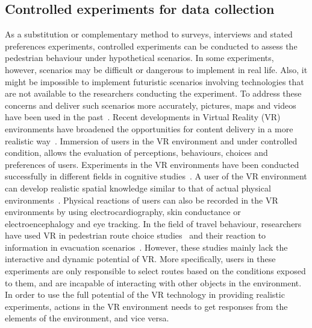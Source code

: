  \subsection{Controlled experiments for data collection}
 As a substitution or complementary method to surveys, interviews and stated preferences experiments, controlled experiments can be conducted to assess the pedestrian behaviour under hypothetical scenarios. In some experiments, however, scenarios may be difficult or dangerous to implement in real life. Also, it might be impossible to implement futuristic scenarios involving technologies that are not available to the researchers conducting the experiment. To address these concerns and deliver such scenarios more accurately, pictures, maps and videos have been used in the past~\cite{song2018external}. Recent developments in Virtual Reality (VR) environments have broadened the opportunities for content delivery in a more realistic way~\cite{farooq2018virtual,jennett2008measuring,animesh2011odyssey,nah2011enhancing,faiola2013correlating}. Immersion of users in the VR environment and under controlled condition, allows the evaluation of perceptions, behaviours, choices and preferences of users. Experiments in the VR environments have been conducted successfully in different fields in cognitive studies~\cite{farooq2018virtual}. A user of the VR environment can develop realistic spatial knowledge similar to that of actual physical environments~\cite{o1992effects,ruddle1997navigating}. Physical reactions of users can also be recorded in the VR environments by using electrocardiography, skin conductance or electroencephalogy and eye tracking. In the field of travel behaviour, researchers have used VR in pedestrian route choice studies~\cite{talaat2008simple} and their reaction to information in evacuation scenarios~\cite{kinateder2014virtual}. However, these studies mainly lack the interactive and dynamic potential of VR. More specifically, users in these experiments are only responsible to select routes based on the conditions exposed to them, and are incapable of interacting with other objects in the environment. In order to use the full potential of the VR technology in providing realistic experiments, actions in the VR environment needs to get responses from the elements of the environment, and vice versa. 

